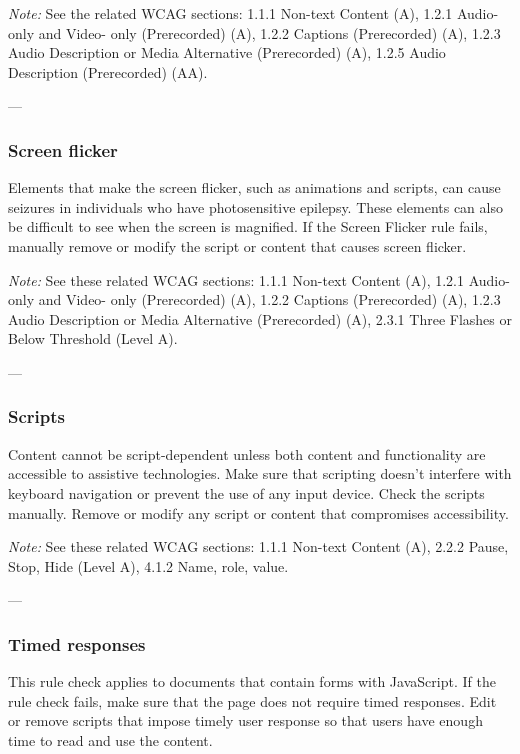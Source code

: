 \vspace{0.5em}
\noindent\textit{Note:} See the related WCAG sections: 1.1.1 Non-text Content (A), 1.2.1 Audio- only and Video- only (Prerecorded) (A), 1.2.2 Captions (Prerecorded) (A), 1.2.3 Audio Description or Media Alternative (Prerecorded) (A), 1.2.5 Audio Description (Prerecorded) (AA)\footnotemark[1].

---

\subsubsection*{Screen flicker}
Elements that make the screen flicker, such as animations and scripts, can cause seizures in individuals who have photosensitive epilepsy. These elements can also be difficult to see when the screen is magnified\footnotemark[1].
If the Screen Flicker rule fails, manually remove or modify the script or content that causes screen flicker.

\vspace{0.5em}
\noindent\textit{Note:} See these related WCAG sections: 1.1.1 Non-text Content (A), 1.2.1 Audio- only and Video- only (Prerecorded) (A), 1.2.2 Captions (Prerecorded) (A), 1.2.3 Audio Description or Media Alternative (Prerecorded) (A), 2.3.1 Three Flashes or Below Threshold (Level A)\footnotemark[1].

---

\subsubsection*{Scripts}
Content cannot be script-dependent unless both content and functionality are accessible to assistive technologies. Make sure that scripting doesn't interfere with keyboard navigation or prevent the use of any input device\footnotemark[1].
Check the scripts manually. Remove or modify any script or content that compromises accessibility.

\vspace{0.5em}
\noindent\textit{Note:} See these related WCAG sections: 1.1.1 Non-text Content (A), 2.2.2 Pause, Stop, Hide (Level A), 4.1.2 Name, role, value\footnotemark[1].

---

\subsubsection*{Timed responses}
This rule check applies to documents that contain forms with JavaScript. If the rule check fails, make sure that the page does not require timed responses. Edit or remove scripts that impose timely user response so that users have enough time to read and use the content\footnotemark[1].

